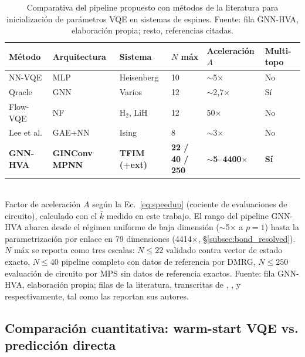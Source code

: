 \documentclass[11pt,a4paper,spanish]{book}
\begin{document}
\begin{table}[h]
\centering
\caption[Comparativa con métodos de la literatura]{Comparativa del pipeline propuesto con métodos de la literatura para inicialización de parámetros VQE en sistemas de espines. Fuente: fila GNN-HVA, elaboración propia; resto, referencias citadas.}
\label{tab:comparison_literature}
\begin{tabular}{p{2.5cm}p{2cm}p{2cm}p{2cm}p{2.5cm}p{2cm}}
\toprule
\textbf{Método} & \textbf{Arquitectura} & \textbf{Sistema} & \textbf{$N$ máx} & \textbf{Aceleración $A$} & \textbf{Multi-topo} \\
\midrule
NN-VQE \citep{miao2024} & MLP & Heisenberg & 10 & $\sim$5$\times$ & No \\
Qracle \citep{zhang2025} & GNN & Varios & 12 & $\sim$2,7$\times$ & Sí \\
Flow-VQE \citep{zou2026} & NF & H$_2$, LiH & 12 & 50$\times$ & No \\
Lee et al. \citep{lee2026} & GAE+NN & Ising & 8 & $\sim$3$\times$ & No \\
\midrule
\textbf{GNN-HVA} & \textbf{GINConv MPNN} & \textbf{TFIM (+ext)} & \textbf{22 / 40 / 250} & \textbf{$\sim$5--4400$\times$} & \textbf{Sí} \\
\bottomrule
\end{tabular}
\\[2pt]
\footnotesize Factor de aceleración $A$ según la Ec.~\ref{eq:speedup} (cociente de evaluaciones de circuito), calculado con el $\bar{k}$ medido en este trabajo. El rango del pipeline GNN-HVA abarca desde el régimen uniforme de baja dimensión ($\sim$5$\times$ a $p = 1$) hasta la parametrización por enlace en 79 dimensiones (4414$\times$, §\ref{subsec:bond_resolved}). $N$ máx se reporta como tres escalas: $N \leq 22$ validado contra vector de estado exacto, $N \leq 40$ pipeline completo con datos de referencia por DMRG, $N \leq 250$ evaluación de circuito por MPS sin datos de referencia exactos. Fuente: fila GNN-HVA, elaboración propia; filas de la literatura, transcritas de \citet{miao2024}, \citet{zhang2025}, \citet{zou2026} y \citet{lee2026} respectivamente, tal como las reportan sus autores.
\end{table}

\subsection{Comparación cuantitativa: warm-start VQE vs. predicción directa}
\end{document}
